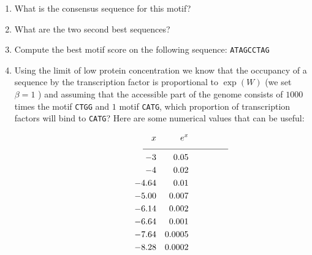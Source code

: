\documentclass[a4paper,11pt]{article}
\begin{document}
\begin{enumerate}
\item What is the consensus sequence for this motif? 
\item What are the two second best sequences?
\item Compute the best motif score on the following sequence: \texttt{ATAGCCTAG}
\item Using the limit of low protein concentration we know that the
  occupancy of a sequence by the transcription factor is
  proportional to $\exp(W)$ (we set $\beta=1$%
  ) and assuming that the accessible part of
  the genome consists of $1000$ times the motif \texttt{CTGG} and $1$
  motif \texttt{CATG}, which proportion of transcription factors
  will bind to \texttt{CATG}? Here are some numerical values that can
  be useful:

\begin{eqnarray*}
\put(-10,-10){\line(10,0){100}}
x&&e^x\\
-3&&0.05\\
-4&&0.02\\
-4.64&&0.01\\
-5.00&&0.007\\
-6.14&&0.002\\
-6.64&&0.001\\
-7.64&&0.0005\\
-8.28&&0.0002
\end{eqnarray*}

\end{enumerate}
\end{document}
